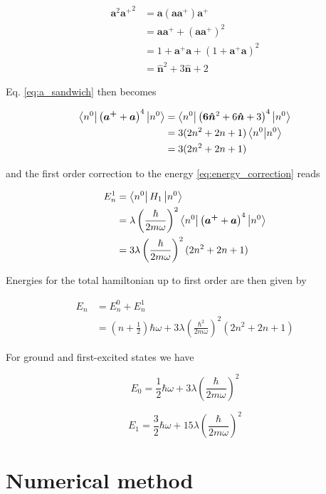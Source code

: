 \documentclass{article}
\begin{document}
\begin{align}
\bm{a}^2 {\bm{a^+}}^2 & = \bm{a} (\bm{a} \bm{a^+}) \bm{a^+} \nonumber \\
& = \bm{a} \bm{a^+} + (\bm{a} \bm{a^+})^2 \nonumber \\
& = 1 + \bm{a^+} \bm{a} + (1 + \bm{a^+} \bm{a})^2 \nonumber \\
& = \bm{ \hat{n} }^2 + 3 \bm{ \hat{n} } + 2
\end{align}

Eq. \eqref{eq:a_sandwich} then becomes


\begin{align}
\bra{n^0} \left( \bm{a^+} + \bm{a} \right)^4 \ket{n^0} & = \bra{n^0} \left( \bm{ 6 \hat{n} }^2 + 6 \bm{ \hat{n} } + 3 \right)^4 \ket{n^0} \nonumber \\
& = 3 (2n^2 + 2n +1) \braket{n^0}{n^0} \nonumber \\
& = 3(2n^2 + 2n +1)
\end{align}

and the first order correction to the energy \eqref{eq:energy_correction} reads

\begin{align}
E_n^1 & = \bra{n^0} H_1 \ket{n^0} \nonumber \\
& = \lambda \left( \frac{\hbar}{2m \omega} \right)^2 \bra{n^0} \left( \bm{a^+} + \bm{a} \right)^4 \ket{n^0} \nonumber \\
& = 3 \lambda \left( \frac{\hbar}{2m \omega} \right)^2 (2n^2 + 2n +1)
\end{align}

Energies for the total hamiltonian up to first order are then given by

\begin{align}
E_n & = E_n^0 + E_n^1 \nonumber \\
& = \left( n + \frac{1}{2} \right) \hbar \omega + 3 \lambda \left( \frac{\hbar^2}{2m\omega} \right)^2 (2n^2 + 2n +1)
\end{align}

For ground and first-excited states we have

\begin{equation}
E_0 = \frac{1}{2} \hbar \omega + 3 \lambda \left( \frac{\hbar}{2m\omega} \right)^2
\end{equation}

\begin{equation}
E_1 = \frac{3}{2} \hbar \omega + 15 \lambda \left( \frac{\hbar}{2m\omega} \right)^2
\end{equation}

\section{Numerical method}
\end{document}
